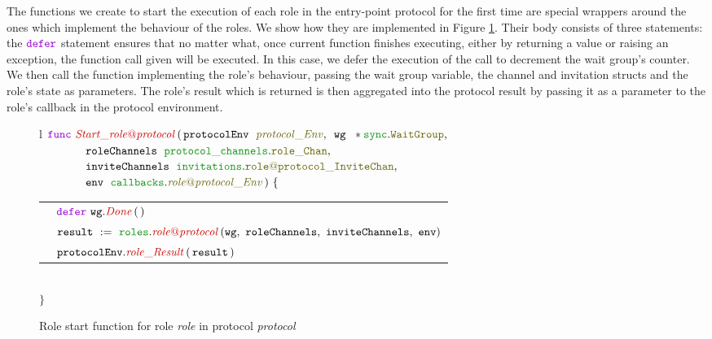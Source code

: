 \documentclass[12pt,twoside]{report}
\begin{document}
The functions we create to start the execution of each role in the entry-point protocol for the first time are special wrappers around the ones which implement the behaviour of the roles. We show how they are implemented in Figure \ref{role-start-function-gen}. Their body consists of three statements: the $\godefer$ statement ensures that no matter what, once current function finishes executing, either by returning a value or raising an exception, the function call given will be executed. In this case, we defer the execution of the call to decrement the wait group's counter. We then call the function implementing the role's behaviour, passing the wait group variable, the channel and invitation structs and the role's state as parameters. The role's result which is returned is then aggregated into the protocol result by passing it as a parameter to the role's callback in the protocol environment.\\

\begin{figure}[!h]
    \begin{center}
        \begin{tabular}{l}
            $\gofunc\ \functionname{Start\_\localprotocol{role}{protocol}} \, (\,\varname{protocolEnv}\ \;\interfacename{protocol\_Env},\ \,\varname{wg}\ \;*\pkgstructaccess{sync}{WaitGroup},$\\
            
            $\qquad \qquad \varname{roleChannels}\ \;\pkgstructaccess{protocol\_channels}{role\_Chan},$\\

            $\qquad \qquad \varname{inviteChannels}\ \;\pkgstructaccess{invitations}{\localprotocol{role}{protocol}\_InviteChan},$\\

            $\qquad \qquad \varname{env}\ \;\pkginterfaceaccess{callbacks}{\localprotocol{role}{protocol}\_Env}\,)\ \{$\\[3pt]

            \begin{tabular}{ll}
                \indent & $\godefer\ \methodcall{wg}{Done}\,(\,)$\\[3.5pt]
                \indent & $\assignment{result}{\pkgfuncaccess{roles}{role@protocol}\,(\roleimplparams)}$\\[3.5pt]
                \indent & $\methodcall{protocolEnv}{role\_Result}\,(\,\varname{result}\,)$
            \end{tabular}\\[3pt]
            $\}$
        \end{tabular}

    \end{center}
    \caption{Role start function for role \textit{role} in protocol \textit{protocol}}
    \label{role-start-function-gen}
\end{figure}
\end{document}
